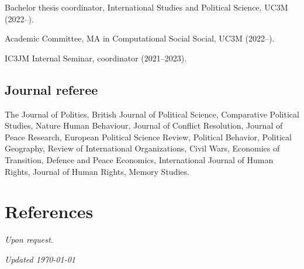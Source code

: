 \documentclass[a4paper, 12pt]{article}
\begin{document}
\noindent
Bachelor thesis coordinator, International Studies and Political Science, UC3M (2022--).

\noindent
Academic Committee, MA in Computational Social Social, UC3M (2022--).

\noindent
IC3JM Internal Seminar, coordinator (2021--2023).

\subsection*{Journal referee}

The Journal of Politics, British Journal of Political Science, Comparative Political Studies, Nature Human Behaviour, Journal of Conflict Resolution, Journal of Peace Research, European Political Science Review, Political Behavior, Political Geography, Review of International Organizations, Civil Wars, Economics of Transition, Defence and Peace Economics, International Journal of Human Rights, Journal of Human Rights, Memory Studies.


\section*{References}

\textit{Upon request.}

%
%
%

\vfill

\noindent
\flushright
{\small\it Updated \monthdate\today}
\end{document}
